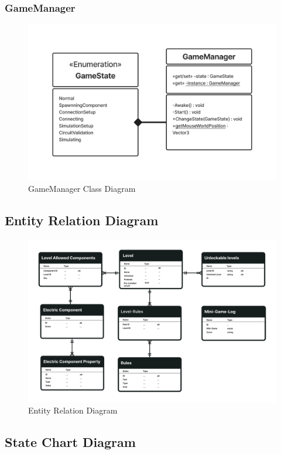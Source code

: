 \documentclass[../main.tex]{subfiles}
\begin{document}
\subsubsection{GameManager}\begin{figure}[h!]
\centering
\includegraphics[scale=0.2]{images/chapter3/Class3.png}
\caption{GameManager Class Diagram}
\label{GameManager }
\end{figure}
\vfill
\newpage
\subsection{Entity Relation Diagram }
\begin{figure}[h!]
\centering
\includegraphics[scale=0.08]{images/chapter3/ERD.png}
\caption{Entity Relation Diagram }
\label{Entity Relation Diagram }
\end{figure}
\vfill
\newpage

\subsection{State Chart Diagram}
\end{document}
